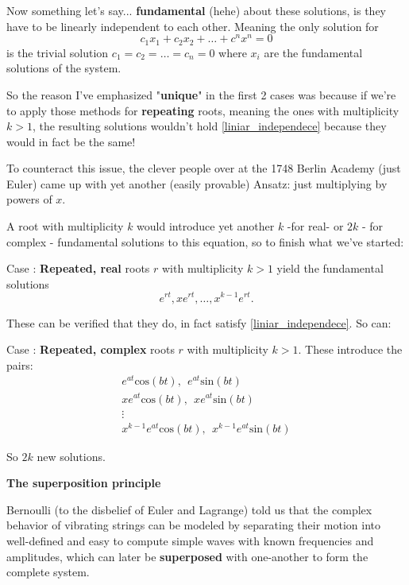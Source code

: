 Now something let's say... \textbf{fundamental} (hehe) about these solutions, is they have to be linearly independent to each other. Meaning the only solution for
\begin{equation}\label{liniar_independece}
	c_1 x_1+c_2 x_2 + \dots + c^n x^n = 0
\end{equation}
is the trivial solution $c_1=c_2=\dots=c_n=0$ where $x_i$ are the fundamental solutions of the system.

So the reason I've emphasized "\textbf{unique}" in the first 2 cases was because if we're to apply those methods for \textbf{repeating} roots, meaning the ones with multiplicity $k>1$, the resulting solutions wouldn't hold \ref{liniar_independece} because they would in fact be the same!

To counteract this issue, the clever people over at the 1748 Berlin Academy (just Euler) came up with yet another (easily provable) Ansatz: just multiplying by powers of $x$.

A root with multiplicity $k$ would introduce yet another $k$ -for real- or $2k$ - for complex - fundamental solutions to this equation, so to finish what we've started:

Case : \textbf{Repeated, real} roots $r$ with multiplicity $k>1$ yield the fundamental solutions
\[
	e^{rt}, xe^{rt}, \dots,x^{k-1}e^{rt}.
\]

These can be verified that they do, in fact satisfy \ref{liniar_independece}. So can:

Case : \textbf{Repeated, complex} roots $r$ with multiplicity $k>1$. These introduce the pairs:
\begin{align*}
	e^{at}\text{cos}(bt), \ \  e^{at}\text{sin}(bt)  \\
	xe^{at}\text{cos}(bt), \ \ xe^{at}\text{sin}(bt) \\
	\vdots                                           \\
	x^{k-1}e^{at}\text{cos}(bt), \ \ x^{k-1}e^{at}\text{sin}(bt)
\end{align*}

So $2k$ new solutions.

\textbf{The superposition principle}\cite{Hiroki2015}

Bernoulli (to the disbelief of Euler and Lagrange) told us that the complex behavior of vibrating strings can be modeled by separating their motion into well-defined and easy to compute simple waves with known frequencies and amplitudes, which can later be \textbf{superposed} with one-another to form the complete system.


